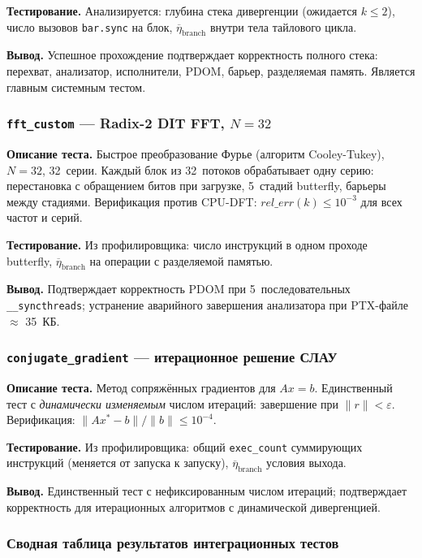 \textbf{Тестирование.}
Анализируется: глубина стека дивергенции (ожидается $k \leq 2$),
число вызовов \texttt{bar.sync} на блок,
$\overline{\eta}_{\mathrm{branch}}$ внутри тела тайлового цикла.

\textbf{Вывод.}
Успешное прохождение подтверждает корректность полного стека:
перехват, анализатор, исполнители, PDOM, барьер, разделяемая память.
Является главным системным тестом.

\subsubsection{\texttt{fft\_custom} --- Radix-2 DIT FFT, $N=32$}

\textbf{Описание теста.}
Быстрое преобразование Фурье (алгоритм Cooley-Tukey), $N=32$,
32~серии. Каждый блок из 32~потоков обрабатывает одну серию:
перестановка с обращением битов при загрузке, 5~стадий butterfly,
барьеры между стадиями.
Верификация против CPU-DFT:
$\mathit{rel\_err}(k) \leq 10^{-3}$ для всех частот и серий.

\textbf{Тестирование.}
Из профилировщика: число инструкций в одном проходе butterfly,
$\overline{\eta}_{\mathrm{branch}}$ на операции с разделяемой памятью.

\textbf{Вывод.}
Подтверждает корректность PDOM при 5~последовательных
\texttt{\_\_syncthreads}; устранение аварийного завершения анализатора
при PTX-файле $\approx$ 35~КБ.

\subsubsection{\texttt{conjugate\_gradient} --- итерационное решение СЛАУ}

\textbf{Описание теста.}
Метод сопряжённых градиентов для $Ax = b$. Единственный тест
с \textit{динамически изменяемым} числом итераций: завершение
при $\|r\| < \varepsilon$.
Верификация: $\|Ax^* - b\| / \|b\| \leq 10^{-4}$.

\textbf{Тестирование.}
Из профилировщика: общий \texttt{exec\_count} суммирующих инструкций
(меняется от запуска к запуску), $\overline{\eta}_{\mathrm{branch}}$
условия выхода.

\textbf{Вывод.}
Единственный тест с нефиксированным числом итераций; подтверждает
корректность для итерационных алгоритмов с динамической дивергенцией.

\subsubsection{Сводная таблица результатов интеграционных тестов}

